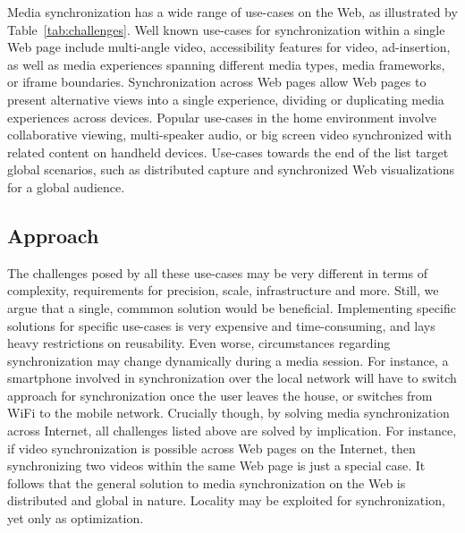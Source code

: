 Media synchronization has a wide range of use-cases on the Web, as illustrated
by Table~\ref{tab:challenges}. Well known use-cases for synchronization within
a single Web page include multi-angle video, accessibility features for video,
ad-insertion, as well as media experiences spanning different media types,
media frameworks, or iframe boundaries. Synchronization across Web pages allow
Web pages to present alternative views into a single experience, dividing or
duplicating media experiences across devices. Popular use-cases in the home
environment involve collaborative viewing, multi-speaker audio, or big screen
video synchronized with related content on handheld devices. Use-cases towards
the end of the list target global scenarios, such as distributed capture and
synchronized Web visualizations for a global audience.

\subsection{Approach}

The challenges posed by all these use-cases may be very different in terms of
complexity, requirements for precision, scale, infrastructure and more. Still,
we argue that a single, commmon solution would be beneficial. Implementing
specific solutions for specific use-cases is very expensive and time-consuming, 
and lays heavy restrictions on reusability. Even worse,
circumstances regarding synchronization may change dynamically during a media
session. For instance, a smartphone involved in synchronization over the local
network will have to switch approach for synchronization once the user leaves
the house, or switches from WiFi to the mobile network. Crucially though, by
solving media synchronization across Internet, all challenges listed above are
solved by implication. For instance, if video synchronization is possible
across Web pages on the Internet, then synchronizing two videos within the
same Web page is just a special case. It follows that the general solution to
media synchronization on the Web is distributed and global in nature. Locality
may be exploited for synchronization, yet only as optimization.
